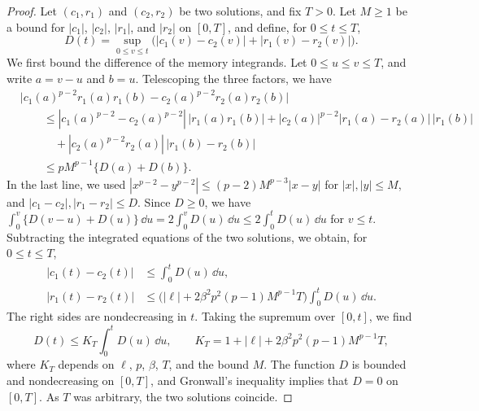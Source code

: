 \begin{proof}
Let $(c_1,r_1)$ and $(c_2,r_2)$ be two solutions, and fix $T>0$. Let $M\ge1$ be a bound for $|c_1|$, $|c_2|$, $|r_1|$, and $|r_2|$ on $[0,T]$, and define, for $0\le t\le T$,
\[
 D(t)=\sup_{0\le v\le t}\bigl(|c_1(v)-c_2(v)|+|r_1(v)-r_2(v)|\bigr).
\]
We first bound the difference of the memory integrands. Let $0\le u\le v\le T$, and write $a=v-u$ and $b=u$. Telescoping the three factors, we have
\[
\begin{aligned}
 &\bigl|c_1(a)^{p-2}r_1(a)r_1(b)-c_2(a)^{p-2}r_2(a)r_2(b)\bigr|\\
 &\qquad\le|c_1(a)^{p-2}-c_2(a)^{p-2}|\,|r_1(a)r_1(b)|
 +|c_2(a)|^{p-2}|r_1(a)-r_2(a)|\,|r_1(b)|\\
 &\qquad\quad+|c_2(a)^{p-2}r_2(a)|\,|r_1(b)-r_2(b)|\\
 &\qquad\le pM^{p-1}\{D(a)+D(b)\}.
\end{aligned}
\]
In the last line, we used $|x^{p-2}-y^{p-2}|\le(p-2)M^{p-3}|x-y|$ for $|x|,|y|\le M$, and $|c_1-c_2|,|r_1-r_2|\le D$. Since $D\ge0$, we have $\int_0^v\{D(v-u)+D(u)\}\,\dd u=2\int_0^vD(u)\,\dd u\le2\int_0^tD(u)\,\dd u$ for $v\le t$. Subtracting the integrated equations of the two solutions, we obtain, for $0\le t\le T$,
\[
\begin{aligned}
 |c_1(t)-c_2(t)|&\le\int_0^tD(u)\,\dd u,\\
 |r_1(t)-r_2(t)|&\le\bigl(|\ell|+2\beta^2p^2(p-1)M^{p-1}T\bigr)\int_0^tD(u)\,\dd u.
\end{aligned}
\]
The right sides are nondecreasing in $t$. Taking the supremum over $[0,t]$, we find
\[
 D(t)\le K_T\int_0^tD(u)\,\dd u,
 \qquad K_T=1+|\ell|+2\beta^2p^2(p-1)M^{p-1}T,
\]
where $K_T$ depends on $\ell$, $p$, $\beta$, $T$, and the bound $M$. The function $D$ is bounded and nondecreasing on $[0,T]$, and Gronwall's inequality implies that $D=0$ on $[0,T]$. As $T$ was arbitrary, the two solutions coincide.
\end{proof}
